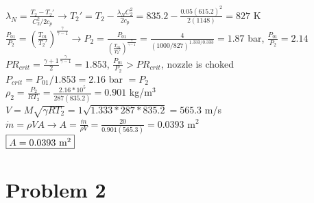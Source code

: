 \documentclass{article}
\begin{document}
$\lambda_N=\frac{T_2-T_2'}{C_2^2/2c_p} \rightarrow T_2'=T_2-\frac{\lambda_NC_2^2}{2c_p}=
835.2-\frac{0.05(615.2)^2}{2(1148)}=827$ K \\
$\frac{P_{01}}{P_{2}}=(\frac{T_{01}}{T_2'})^\frac{\gamma}{\gamma-1}
\rightarrow P_2=\frac{P_{01}}{(\frac{T_{01}}{T_2'})^\frac{\gamma}{\gamma-1}}=
\frac{4}{(1000/827)^{1.333/0.333}}=1.87$ bar, \quad $\frac{P_{01}}{P_2}=2.14$ \\
$PR_{crit}=\frac{\gamma+1}{2}^\frac{\gamma}{\gamma-1}=1.853$, \quad $\frac{P_{01}}{P_2}>PR_{crit}$,
\quad nozzle is choked \\
$P_{crit}=P_{01}/1.853=2.16$ bar $=P_2$ \\
$\rho_2=\frac{P_2}{RT_2}=\frac{2.16*10^5}{287(835.2)}=0.901$ kg/m$^3$ \\
$V=M\sqrt{\gamma RT_2}=1\sqrt{1.333*287*835.2}=565.3$ m/s \\
$\dot{m}=\rho VA \rightarrow A=\frac{\dot{m}}{\rho V}=\frac{20}{0.901(565.3)}=0.0393$ m$^2$ \\
$\fbox{$A=0.0393$ m$^2$}$

\section*{Problem 2}
\end{document}
